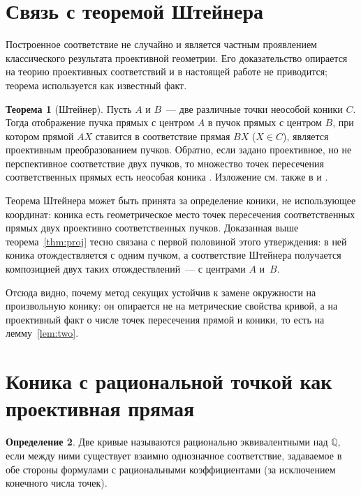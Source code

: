 \documentclass[a4paper,14pt]{extreport}
\theoremstyle{definition}
\newtheorem{thm}{Теорема}[chapter]
\newtheorem{defn}[thm]{Определение}
\newcommand{\Q}{\mathbb{Q}}
\begin{document}
\section{Связь с теоремой Штейнера}

Построенное соответствие не случайно и является частным проявлением
классического результата проективной геометрии. Его доказательство опирается на
теорию проективных соответствий и в настоящей работе не приводится; теорема
используется как известный факт.

\begin{thm}[Штейнер]\label{thm:steiner}
Пусть $A$ и $B$~--- две различные точки неособой коники $C$. Тогда отображение
пучка прямых с центром $A$ в пучок прямых с центром $B$, при котором прямой
$AX$ ставится в соответствие прямая $BX$ ($X\in C$), является проективным
преобразованием пучков. Обратно, если задано проективное, но не перспективное
соответствие двух пучков, то множество точек пересечения соответственных прямых
есть неособая коника \cite[гл.~II, \S~14]{efimov}. Изложение см. также в
\cite[гл.~8]{coxeter} и \cite[\S~20]{hartshorne}.
\end{thm}

Теорема Штейнера может быть принята за определение коники, не использующее
координат: коника есть геометрическое место точек пересечения соответственных
прямых двух проективно соответственных пучков. Доказанная выше
теорема~\ref{thm:proj} тесно связана с первой половиной этого утверждения: в ней
коника отождествляется с одним пучком, а соответствие Штейнера получается
композицией двух таких отождествлений~--- с центрами $A$ и~$B$.

Отсюда видно, почему метод секущих устойчив к замене окружности на произвольную
конику: он опирается не на метрические свойства кривой, а на проективный факт о
числе точек пересечения прямой и коники, то есть на лемму~\ref{lem:two}.

\section{Коника с рациональной точкой как проективная прямая}

\begin{defn}
Две кривые называются рационально эквивалентными над $\Q$, если между ними
существует взаимно однозначное соответствие, задаваемое в обе стороны формулами
с рациональными коэффициентами (за исключением конечного числа точек).
\end{defn}
\end{document}
